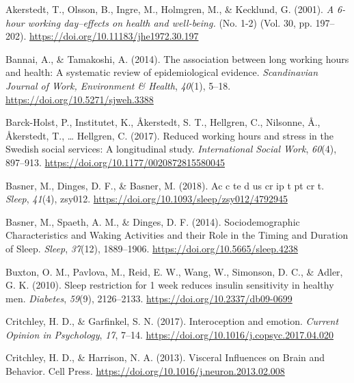 \documentclass[
  english,
  man]{apa6}
\newlength{\cslhangindent}
\newenvironment{cslreferences}%
  {\setlength{\parindent}{0pt}%
  \everypar{\setlength{\hangindent}{\cslhangindent}}\ignorespaces}%
  {\par}
\begin{document}
\begingroup
\setlength{\parindent}{-0.5in}
\setlength{\leftskip}{0.5in}

\hypertarget{refs}{}
\begin{cslreferences}
\leavevmode\hypertarget{ref-Akerstedt2001}{}%
Akerstedt, T., Olsson, B., Ingre, M., Holmgren, M., \& Kecklund, G. (2001). \emph{A 6-hour working day--effects on health and well-being.} (No. 1-2) (Vol. 30, pp. 197--202). \url{https://doi.org/10.11183/jhe1972.30.197}

\leavevmode\hypertarget{ref-Bannai2014}{}%
Bannai, A., \& Tamakoshi, A. (2014). The association between long working hours and health: A systematic review of epidemiological evidence. \emph{Scandinavian Journal of Work, Environment \& Health}, \emph{40}(1), 5--18. \url{https://doi.org/10.5271/sjweh.3388}

\leavevmode\hypertarget{ref-Barck-Holst2017}{}%
Barck-Holst, P., Institutet, K., Åkerstedt, S. T., Hellgren, C., Nilsonne, Å., Åkerstedt, T., \ldots{} Hellgren, C. (2017). Reduced working hours and stress in the Swedish social services: A longitudinal study. \emph{International Social Work}, \emph{60}(4), 897--913. \url{https://doi.org/10.1177/0020872815580045}

\leavevmode\hypertarget{ref-Basner2018}{}%
Basner, M., Dinges, D. F., \& Basner, M. (2018). Ac c te d us cr ip t pt cr t. \emph{Sleep}, \emph{41}(4), zsy012. \url{https://doi.org/10.1093/sleep/zsy012/4792945}

\leavevmode\hypertarget{ref-Basner2014}{}%
Basner, M., Spaeth, A. M., \& Dinges, D. F. (2014). Sociodemographic Characteristics and Waking Activities and their Role in the Timing and Duration of Sleep. \emph{Sleep}, \emph{37}(12), 1889--1906. \url{https://doi.org/10.5665/sleep.4238}

\leavevmode\hypertarget{ref-Buxton2010}{}%
Buxton, O. M., Pavlova, M., Reid, E. W., Wang, W., Simonson, D. C., \& Adler, G. K. (2010). Sleep restriction for 1 week reduces insulin sensitivity in healthy men. \emph{Diabetes}, \emph{59}(9), 2126--2133. \url{https://doi.org/10.2337/db09-0699}

\leavevmode\hypertarget{ref-Critchley2017}{}%
Critchley, H. D., \& Garfinkel, S. N. (2017). Interoception and emotion. \emph{Current Opinion in Psychology}, \emph{17}, 7--14. \url{https://doi.org/10.1016/j.copsyc.2017.04.020}

\leavevmode\hypertarget{ref-Critchley2013}{}%
Critchley, H. D., \& Harrison, N. A. (2013). Visceral Influences on Brain and Behavior. Cell Press. \url{https://doi.org/10.1016/j.neuron.2013.02.008}


\end{cslreferences}
\end{document}
